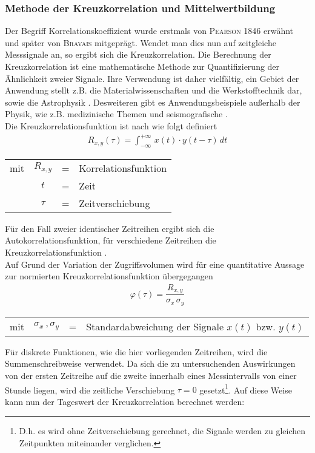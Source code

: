 \documentclass[fontsize=11pt, twoside, a4paper]{scrartcl}
\begin{document}
\subsubsection{Methode der Kreuzkorrelation und Mittelwertbildung}
Der Begriff Korrelationskoeffizient wurde erstmals von \textsc{Pearson} \textsc{1846} \cite{Pearson} erwähnt und später von \textsc{Bravais} mitgeprägt. Wendet man dies nun auf zeitgleiche Messsignale an, so ergibt sich die Kreuzkorrelation. Die Berechnung der Kreuzkorrelation ist eine mathematische Methode zur Quantifizierung der Ähnlichkeit zweier Signale. Ihre Verwendung ist daher vielfältig, ein Gebiet der Anwendung stellt z.B. die Materialwissenschaften und die Werkstofftechnik \cite{Ultraschall} dar, sowie die Astrophysik \cite{DarkEnergy}. Desweiteren gibt es Anwendungsbeispiele außerhalb der Physik, wie z.B. medizinische Themen \cite{Psychosozial} und seismografische \cite{RandomFields}.\\
Die Kreuzkorrelationsfunktion ist nach \cite{Signaluebertragung} wie folgt definiert
\begin{align}
R_{x,y}(\tau) = \int_{- \infty}^{+ \infty} \, x(t) \cdot y(t-\tau) \, dt
\end{align}
\begin{table}[H]
\begin{tabular}{rccl}
mit  & $R_{x,y}$ & = & Korrelationsfunktion\\
	 & $t$ & = & Zeit\\
	 & $\tau$ & = & Zeitverschiebung\\
\end{tabular}
\end{table}
Für den Fall zweier identischer Zeitreihen ergibt sich die Autokorrelationsfunktion, für verschiedene Zeitreihen die Kreuzkorrelationsfunktion \cite{Ultraschall}. \\
Auf Grund der Variation der Zugriffsvolumen wird für eine quantitative Aussage zur normierten Kreuzkorrelationsfunktion \cite{Ultraschall} übergegangen
\begin{align}
\varphi(\tau) = \dfrac{R_{x,y}}{\sigma_{x}\,\sigma_{y}}
\label{KK}
\end{align}
\begin{table}[H]
\begin{tabular}{rccl}
mit  & $\sigma_{x} \, , \sigma_{y}$ & = & Standardabweichung der Signale $x(t)$ bzw. $y(t)$\\
\end{tabular}
\end{table}
Für diskrete Funktionen, wie die hier vorliegenden Zeitreihen, wird die Summenschreibweise verwendet. Da sich die zu untersuchenden Auswirkungen von der ersten Zeitreihe auf die zweite innerhalb eines Messintervalls von einer Stunde liegen, wird die zeitliche Verschiebung $\tau = 0$ gesetzt\footnote{D.h. es wird ohne Zeitverschiebung gerechnet, die Signale werden zu gleichen Zeitpunkten miteinander verglichen.}. Auf diese Weise kann nun der Tageswert der Kreuzkorrelation berechnet werden:
\end{document}

